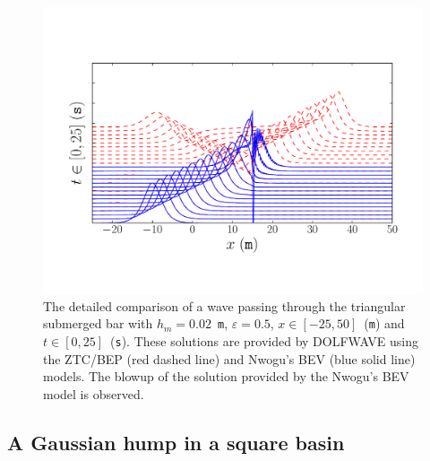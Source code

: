 \begin{figure}
  \begin{center}
    \includegraphics[width=\largefig]{chapters/lopes/pdf/epsilon0_5.pdf}
  \end{center}
  \caption{The detailed comparison of a wave passing through the
    triangular submerged bar with $h_m=0.02$~{\tt m}, $\varepsilon=0.5$,
    $x\in[-25,50]$~({\tt m}) and $t\in[0,25]$~({\tt s}).  These solutions
    are provided by DOLFWAVE using the ZTC/BEP (red dashed line) and
    Nwogu's BEV (blue solid line) models.  The blowup of the solution
    provided by the Nwogu's BEV model is observed.}
  \label{fig:lopes:zn05}
\end{figure}

\subsection{A Gaussian hump in a square basin}

